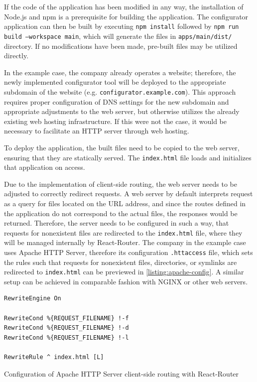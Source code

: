 If the code of the application has been modified in any way, the installation of Node.js and npm is a prerequisite for building the application. The configurator application can then be built by executing \texttt{npm install} followed by \texttt{npm run build --workspace main}, which will generate the files in \texttt{apps/main/dist/} directory. If no modifications have been made, pre-built files may be utilized directly.

In the example case, the company already operates a website; therefore, the newly implemented configurator tool will be deployed to the appropriate subdomain of the website (e.g. \texttt{configurator.example.com}). This approach requires proper configuration of DNS settings for the new subdomain and appropriate adjustments to the web server, but otherwise utilizes the already existing web hosting infrastructure. If this were not the case, it would be necessary to facilitate an HTTP server through web hosting.

To deploy the application, the built files need to be copied to the web server, ensuring that they are statically served. The \texttt{index.html} file loads and initializes that application on access.

Due to the implementation of client-side routing, the web server needs to be adjusted to correctly redirect requests. A web server by default interprets request as a query for files located on the URL address, and since the routes defined in the application do not correspond to the actual files, the  responses would be returned. Therefore, the server needs to be configured in such a way, that requests for nonexistent files are redirected to the \texttt{index.html} file, where they will be managed internally by React-Router. The company in the example case uses Apache HTTP Server, therefore its configuration \texttt{.httaccess} file, which sets the rules such that requests for nonexistent files, directories, or symlinks are redirected to \texttt{index.html} can be previewed in \autoref{listing:apache-config}. A similar setup can be achieved in comparable fashion with NGINX or other web servers.

\begin{listing}[h]
\begin{verbatim}
RewriteEngine On
 
RewriteCond %{REQUEST_FILENAME} !-f
RewriteCond %{REQUEST_FILENAME} !-d
RewriteCond %{REQUEST_FILENAME} !-l
 
RewriteRule ^ index.html [L]
\end{verbatim}
\caption{Configuration of Apache HTTP Server client-side routing with React-Router}
\label{listing:apache-config}
\end{listing}

